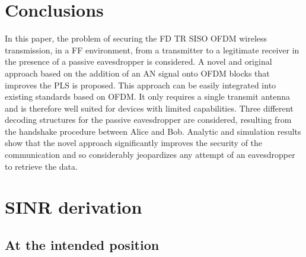 \documentclass[journal,comsoc]{IEEEtran}
\let\MYoriglatexcaption\caption
\renewcommand{\caption}[2][\relax]{\MYoriglatexcaption[#2]{#2}}
\begin{document}
\section{Conclusions}\label{sec:conclusions}
In this paper, the problem of securing the FD TR SISO OFDM wireless transmission, in a FF environment, from a transmitter to a legitimate receiver in the presence of a passive eavesdropper is considered. A novel and original approach based on the addition of an AN signal onto OFDM blocks that improves the PLS is proposed. This approach can be easily integrated into existing standards based on OFDM. It only requires a single transmit antenna and is therefore well suited for devices with limited capabilities. Three different decoding structures for the passive eavesdropper are considered, resulting from the handshake procedure between Alice and Bob. Analytic and simulation results show that the novel approach significantly improves the security of the communication and so considerably jeopardizes any attempt of an eavesdropper to retrieve the data.














\appendices
\section{SINR derivation}\label{sec:sinr-derivation-app}


\subsection{At the intended position}
\end{document}

